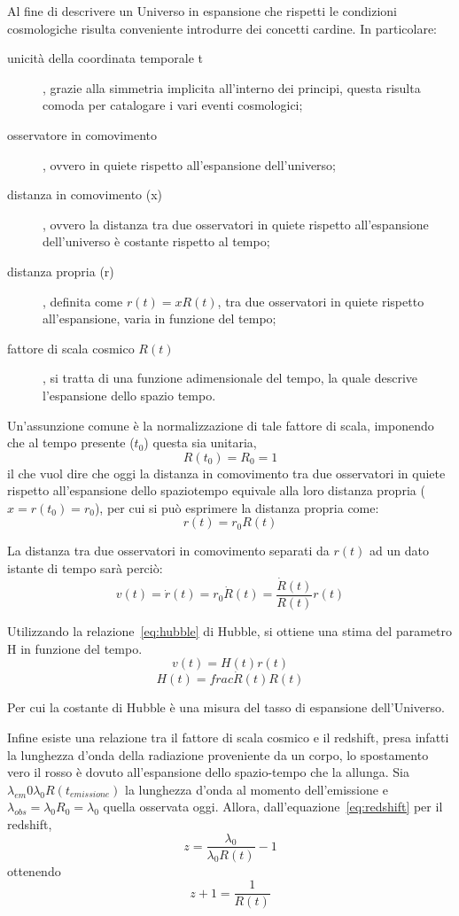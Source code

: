 Al fine di descrivere un Universo in espansione che rispetti le condizioni cosmologiche risulta conveniente introdurre dei concetti cardine. In particolare:
\begin{description}
    \item[unicità della coordinata temporale t], grazie alla simmetria implicita all'interno dei principi, questa risulta comoda per catalogare i vari eventi cosmologici;
    \item[osservatore in comovimento], ovvero in quiete rispetto all'espansione dell'universo;
    \item[distanza in comovimento (x)], ovvero la distanza tra due osservatori in quiete rispetto all'espansione dell'universo è costante rispetto al tempo;
    \item[distanza propria (r)], definita come $r(t) = x R(t)$, tra due osservatori in quiete rispetto all'espansione, varia in funzione del tempo;
    \item[fattore di scala cosmico $R(t)$], si tratta di una funzione adimensionale del tempo, la quale descrive l'espansione dello spazio tempo.
\end{description}

Un'assunzione comune è la normalizzazione di tale fattore di scala, imponendo che al tempo presente ($t_0$) questa sia unitaria,
\[
    R(t_0) = R_0 = 1
\]
il che vuol dire che oggi la distanza in comovimento tra due osservatori in quiete rispetto all'espansione dello spaziotempo equivale alla loro distanza propria ($x = r(t_0) = r_0$), per cui si può esprimere la distanza propria come:
\[
    r(t)= r_0 R(t)
\]

La distanza tra due osservatori in comovimento separati da $r(t)$ ad un dato istante di tempo sarà perciò:
\begin{equation}
    v(t) = \dot{r}(t) = r_0 \dot{R}(t) = \frac{\dot{R}(t)}{R(t)}r(t)
\end{equation}

Utilizzando la relazione~\ref{eq:hubble} di Hubble, si ottiene una stima del parametro H in funzione del tempo.
\[
    v(t) = H(t)r(t)
\]
\begin{equation}
    H(t) = frac{\dot{R}(t)}{R(t)}
\end{equation}

Per cui la costante di Hubble è una misura del tasso di espansione dell'Universo.

Infine esiste una relazione tra il fattore di scala cosmico e il redshift, presa infatti la lunghezza d'onda della radiazione proveniente da un corpo, lo spostamento vero il rosso è dovuto all'espansione dello spazio-tempo che la allunga. Sia $\lambda_{em} 0 \lambda_0 R(t_{emissione})$ la lunghezza d'onda al momento dell'emissione e $\lambda_{obs} = \lambda_0 R_0 = \lambda_0$ quella osservata oggi. Allora, dall'equazione~\ref{eq:redshift} per il redshift,
\[
    z = \frac{\lambda_0}{\lambda_0 R(t)}-1
\]
ottenendo
\begin{equation}
    z + 1 = \frac{1}{R(t)} 
\end{equation}